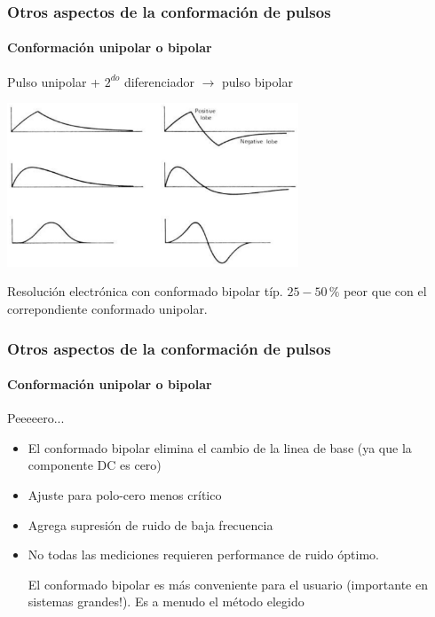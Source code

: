 \documentclass{beamer}
\begin{document}
\begin{frame}
\frametitle{Otros aspectos de la conformación de pulsos}
\framesubtitle{Conformación unipolar o bipolar} 
\begin{alertblock}{}
Pulso unipolar + $2^{do}$ diferenciador $\rightarrow$ pulso bipolar
\end{alertblock}
\begin{center}
\includegraphics[width=0.65\textwidth]{d2/bipolar_unipolar_pulses}
\end{center}
Resolución electrónica con conformado bipolar típ. $25 - 50\,\%$ peor que con
el correpondiente conformado unipolar.
\end{frame} 

\begin{frame}
\frametitle{Otros aspectos de la conformación de pulsos}
\framesubtitle{Conformación unipolar o bipolar} 
Peeeeero...
\begin{itemize}
	\item El conformado bipolar elimina el cambio de la linea de base (ya que la 
componente DC es cero) 
	\item Ajuste para polo-cero menos crítico
	\item Agrega supresión de ruido de baja frecuencia
	\item No todas las mediciones requieren performance de ruido óptimo.

El conformado bipolar es más conveniente para el usuario (importante en sistemas 
grandes!). Es a menudo el método elegido
\end{itemize}
\end{frame} 
\end{document}
